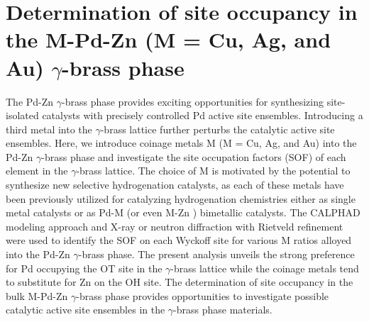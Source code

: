\section{Determination of site occupancy in the M-Pd-Zn (M = Cu, Ag, and Au) \texorpdfstring{$\gamma$}--brass phase} \label{intermetallics:sec:PdZnM}
The Pd-Zn $\gamma$-brass phase provides exciting opportunities for synthesizing site-isolated catalysts with precisely controlled Pd active site ensembles. Introducing a third metal into the $\gamma$-brass lattice further perturbs the catalytic active site ensembles. Here, we introduce coinage metals M (M = Cu, Ag, and Au) into the Pd-Zn $\gamma$-brass phase and investigate the site occupation factors (SOF) of each element in the $\gamma$-brass lattice. The choice of M is motivated by the potential to synthesize new selective hydrogenation catalysts, as each of these metals have been previously utilized for catalyzing hydrogenation chemistries either as single metal catalysts \cite{chou1987benzene, chou1987benzeneII} or as Pd-M \cite{zhang2000synergetic, choudhary2003acetylene, chen2005promotional, friedrich2013order, mccue2014cu, kyriakou2012isolated} (or even M-Zn \cite{spanjers2014zinc}) bimetallic catalysts. The CALPHAD modeling approach and X-ray or neutron diffraction with Rietveld refinement were used to identify the SOF on each Wyckoff site for various M ratios alloyed into the Pd-Zn $\gamma$-brass phase. The present analysis unveils the strong preference for Pd occupying the OT site in the $\gamma$-brass lattice while the coinage metals tend to substitute for Zn on the OH site.  The determination of site occupancy in the bulk M-Pd-Zn $\gamma$-brass phase provides opportunities to investigate possible catalytic active site ensembles in the $\gamma$-brass phase materials.

